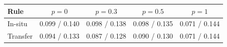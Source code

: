\setlength{\tabcolsep}{3pt}
\begin{tabular}{lcccc}
\toprule
Rule & $p=0$ & $p=0.3$ & $p=0.5$ & $p=1$ \\
\midrule
In-situ & 0.099 / 0.140 & 0.098 / 0.138 & 0.098 / 0.135 & 0.071 / 0.144 \\
Transfer & 0.094 / 0.133 & 0.087 / 0.128 & 0.090 / 0.130 & 0.071 / 0.144 \\
\bottomrule
\end{tabular}
